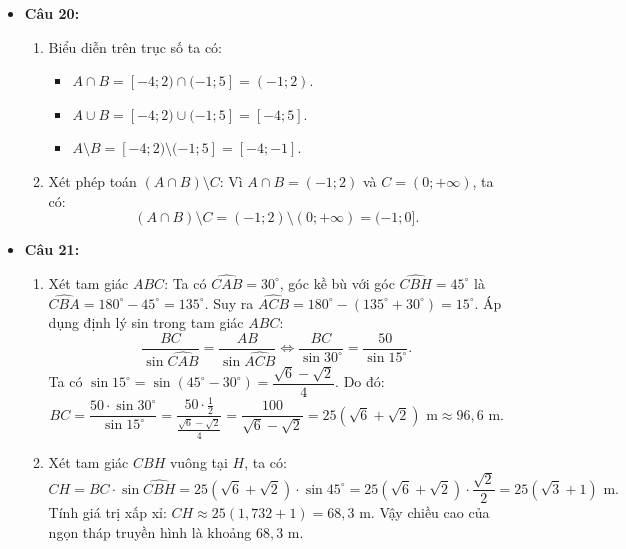 \documentclass[12pt,a4paper]{article}
\begin{document}
\begin{itemize}[leftmargin=0.6cm, itemsep=2.5pt]
    \item \textbf{Câu 20:}
    \begin{enumerate}
        \item Biểu diễn trên trục số ta có:
        \begin{itemize}
            \item $A \cap B = [-4; 2) \cap (-1; 5] = (-1; 2)$.
            \item $A \cup B = [-4; 2) \cup (-1; 5] = [-4; 5]$.
            \item $A \setminus B = [-4; 2) \setminus (-1; 5] = [-4; -1]$.
        \end{itemize}
        \item Xét phép toán $(A \cap B) \setminus C$:
        Vì $A \cap B = (-1; 2)$ và $C = (0; +\infty)$, ta có:
        \[
        (A \cap B) \setminus C = (-1; 2) \setminus (0; +\infty) = (-1; 0].
        \]
    \end{enumerate}

    \item \textbf{Câu 21:}
    \begin{enumerate}
        \item Xét tam giác $ABC$:
        Ta có $\widehat{CAB} = 30^\circ$, góc kề bù với góc $\widehat{CBH} = 45^\circ$ là $\widehat{CBA} = 180^\circ - 45^\circ = 135^\circ$.
        Suy ra $\widehat{ACB} = 180^\circ - (135^\circ + 30^\circ) = 15^\circ$.
        Áp dụng định lý sin trong tam giác $ABC$:
        \[
        \dfrac{BC}{\sin \widehat{CAB}} = \dfrac{AB}{\sin \widehat{ACB}} \iff \dfrac{BC}{\sin 30^\circ} = \dfrac{50}{\sin 15^\circ}.
        \]
        Ta có $\sin 15^\circ = \sin(45^\circ - 30^\circ) = \dfrac{\sqrt{6} - \sqrt{2}}{4}$. Do đó:
        \[
        BC = \dfrac{50 \cdot \sin 30^\circ}{\sin 15^\circ} = \dfrac{50 \cdot \frac{1}{2}}{\frac{\sqrt{6} - \sqrt{2}}{4}} = \dfrac{100}{\sqrt{6} - \sqrt{2}} = 25(\sqrt{6} + \sqrt{2})\text{ m} \approx 96{,}6\text{ m}.
        \]
        \item Xét tam giác $CBH$ vuông tại $H$, ta có:
        \[
        CH = BC \cdot \sin \widehat{CBH} = 25(\sqrt{6} + \sqrt{2}) \cdot \sin 45^\circ = 25(\sqrt{6} + \sqrt{2}) \cdot \dfrac{\sqrt{2}}{2} = 25(\sqrt{3} + 1)\text{ m}.
        \]
        Tính giá trị xấp xỉ: $CH \approx 25(1{,}732 + 1) = 68{,}3\text{ m}$.
        Vậy chiều cao của ngọn tháp truyền hình là khoảng $68{,}3\text{ m}$.
    \end{enumerate}


\end{itemize}
\end{document}
